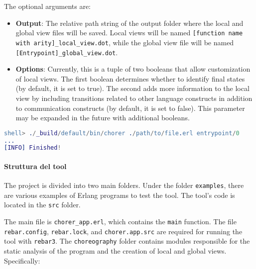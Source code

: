 \noindent The optional arguments are:
\begin{itemize}
    \item \textbf{Output}: The relative path string of the output folder where
    the local and global view files will be saved. Local views will be named
    \texttt{[function name with arity]\_local\_view.dot}, while the global view
    file will be named \texttt{[Entrypoint]\_global\_view.dot}.
    \item \textbf{Options}: Currently, this is a tuple of two booleans that
    allow customization of local views. The first boolean determines whether to
    identify final states (by default, it is set to true). The second adds more
    information to the local view by including transitions related to other
    language constructs in addition to communication constructs (by default, it
    is set to false). This parameter may be expanded in the future with
    additional booleans.
\end{itemize}

\begin{lstlisting}[language=Erlang, caption=Use example of the tool]
shell> ./_build/default/bin/chorer ./path/to/file.erl entrypoint/0
...
[INFO] Finished!
\end{lstlisting}

\paragraph{Struttura del tool}
The project is divided into two main folders. Under the folder \texttt{examples},
there are various examples of Erlang programs to test the tool. The tool's code
is located in the \texttt{src} folder.

\bigskip


\bigskip

The main file is \texttt{chorer\_app.erl}, which contains the \texttt{main}
function. The file \texttt{rebar.config}, \texttt{rebar.lock}, and
\texttt{chorer.app.src} are required for running the tool with \texttt{rebar3}.
The \texttt{choreography} folder contains modules responsible for the static
analysis of the program and the creation of local and global views. Specifically:

